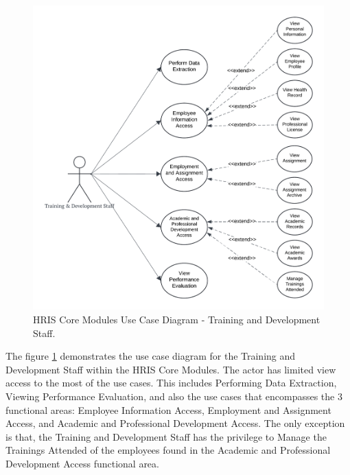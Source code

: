     \begin{figure}[H]
        \centering
        \includegraphics[width=0.9\linewidth]{figures/images/diagrams/usecase/use-case-basic-5.png}
        \caption{HRIS Core Modules Use Case Diagram - Training and Development Staff.}
        \label{fig:use-case-basic-5}
    \end{figure}
    
    The figure \ref{fig:use-case-basic-5} demonstrates the use case diagram for the Training and Development Staff within the HRIS Core Modules. The actor has limited view access to the most of the use cases. This includes Performing Data Extraction, Viewing Performance Evaluation, and also the use cases that  encompasses the 3 functional areas: Employee Information Access, Employment and Assignment Access, and Academic and Professional Development Access. The only exception is that, the Training and Development Staff has the privilege to Manage the Trainings Attended of the employees found in the Academic and Professional Development Access functional area.


